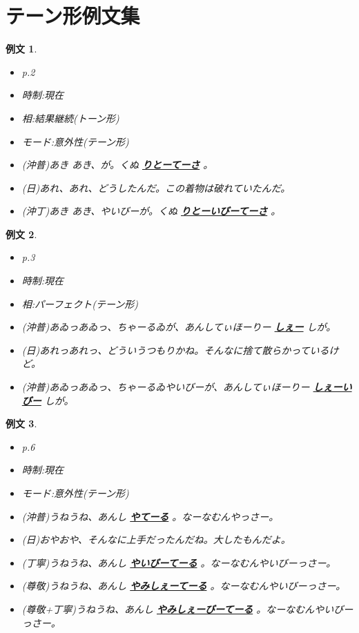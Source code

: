 \documentclass[a4j,12pt]{jarticle}
\theoremstyle{break}
\newtheorem{example}{例文}
\newcommand{\highlight}[1]{
  \textbf{\underline{#1}}
}
\begin{document}
\section*{テーン形例文集}
\begin{example}
  \label{ex:p2}
  \begin{itemize}
  \item p.2
  \item 時制:現在
  \item 相:結果継続(トーン形)
  \item モード:意外性(テーン形)
  \item (沖普)あき あき、が。くぬ\highlight{りとーてーさ}。
  \item (日)あれ、あれ、どうしたんだ。この着物は破れていたんだ。
  \item (沖丁)あき あき、やいびーが。くぬ\highlight{りとーいびーてーさ}。
\end{itemize}
\end{example}
\begin{example}
  \begin{itemize}
    \item p.3
    \item 時制:現在
    \item 相:パーフェクト(テーン形)
    \item (沖普)あゐっあゐっ、ちゃーるゐが、あんしてぃほーりー\highlight{しぇー}しが。
    \item (日)あれっあれっ、どういうつもりかね。そんなに捨て散らかっているけど。
    \item (沖普)あゐっあゐっ、ちゃーるゐやいびーが、あんしてぃほーりー\highlight{しぇーいびー}しが。
  \end{itemize}
\end{example}
\begin{example}
  \begin{itemize}
    \item p.6
    \item 時制:現在
    \item モード:意外性(テーン形)
    \item (沖普)うねうね、あんし\highlight{やてーる}。なーなむんやっさー。
    \item (日)おやおや、そんなに上手だったんだね。大したもんだよ。
    \item (丁寧)うねうね、あんし\highlight{やいびーてーる}。なーなむんやいびーっさー。
    \item (尊敬)うねうね、あんし\highlight{やみしぇーてーる}。なーなむんやいびーっさー。
    \item (尊敬+丁寧)うねうね、あんし\highlight{やみしぇーびーてーる}。なーなむんやいびーっさー。
  \end{itemize}
\end{example}
\end{document}
